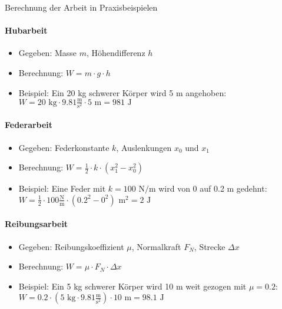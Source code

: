 \begin{KR}{Berechnung der Arbeit in Praxisbeispielen}\\
    \paragraph{Hubarbeit}
    \begin{itemize}
        \item Gegeben: Masse $m$, Höhendifferenz $h$
        \item Berechnung: $W = m \cdot g \cdot h$
        \item Beispiel: Ein 20 kg schwerer Körper wird 5 m angehoben:
        $W = 20 \text{ kg} \cdot 9.81 \frac{\text{m}}{\text{s}^2} \cdot 5 \text{ m} = 981 \text{ J}$
    \end{itemize}
    
    \paragraph{Federarbeit}
    \begin{itemize}
        \item Gegeben: Federkonstante $k$, Auslenkungen $x_0$ und $x_1$
        \item Berechnung: $W = \frac{1}{2} \cdot k \cdot (x_1^2 - x_0^2)$
        \item Beispiel: Eine Feder mit $k = 100 \text{ N/m}$ wird von 0 auf 0.2 m gedehnt:
        $W = \frac{1}{2} \cdot 100 \frac{\text{N}}{\text{m}} \cdot (0.2^2 - 0^2) \text{ m}^2 = 2 \text{ J}$
    \end{itemize}
    
    \paragraph{Reibungsarbeit}
    \begin{itemize}
        \item Gegeben: Reibungskoeffizient $\mu$, Normalkraft $F_N$, Strecke $\Delta x$
        \item Berechnung: $W = \mu \cdot F_N \cdot \Delta x$
        \item Beispiel: Ein 5 kg schwerer Körper wird 10 m weit gezogen mit $\mu = 0.2$:
        $W = 0.2 \cdot (5 \text{ kg} \cdot 9.81 \frac{\text{m}}{\text{s}^2}) \cdot 10 \text{ m} = 98.1 \text{ J}$
    \end{itemize}
\end{KR}

